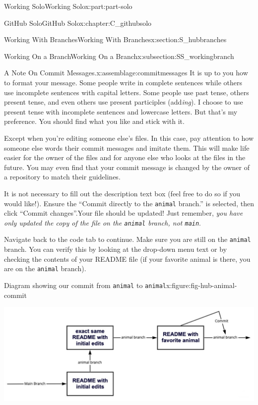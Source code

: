 \documentclass[oneside,10pt,]{book}
\newcommand{\mono}[1]{\texttt{#1}}
\begin{document}
\begin{partptx}{Working Solo}{}{Working Solo}{}{}{x:part:part-solo}
\begin{chapterptx}{GitHub Solo}{}{GitHub Solo}{}{}{x:chapter:C_githubsolo}
\begin{sectionptx}{Working With Branches}{}{Working With Branches}{}{}{x:section:S_hubbranches}
\begin{subsectionptx}{Working On a Branch}{}{Working On a Branch}{}{}{x:subsection:SS_workingbranch}
\begin{assemblage}{A Note On Commit Messages.}{x:assemblage:commitmessages}
It is up to you how to format your message. Some people write in complete sentences while others use incomplete sentences with capital letters. Some people use past tense, others present tense, and even others use present participles (add\emph{ing}). I choose to use present tense with incomplete sentences and lowercase letters. But that's my preference. You should find what you like and stick with it.%
\par
\textellipsis{}Except when you're editing someone else's files. In this case, pay attention to how someone else words their commit messages and imitate them. This will make life easier for the owner of the files and for anyone else who looks at the files in the future. You may even find that your commit message is changed by the owner of a repository to match their guidelines.%
\end{assemblage}
It is not necessary to fill out the description text box (feel free to do so if you would like!). Ensure the ``Commit directly to the \mono{animal} branch.'' is selected, then click ``Commit changes''.Your file should be updated! Just remember, \emph{you have only updated the copy of the file on the \mono{animal} branch, not \mono{main}}.%
\par
Navigate back to the code tab to continue. Make sure you are still on the \mono{animal} branch. You can verify this by looking at the drop-down menu text or by checking the contents of your README file (if your favorite animal is there, you are on the \mono{animal} branch).%
\begin{figureptx}{Diagram showing our commit from \mono{animal} to \mono{animal}}{x:figure:fig-hub-animal-commit}{}%
\begin{image}{0.05}{0.9}{0.05}%
\includegraphics[width=\linewidth]{external/hub_animal_commit.pdf}
\end{image}%
\tcblower
\end{figureptx}%
\end{subsectionptx}
%
%
\typeout{************************************************}

\end{sectionptx}
\end{chapterptx}
\end{partptx}
\end{document}
